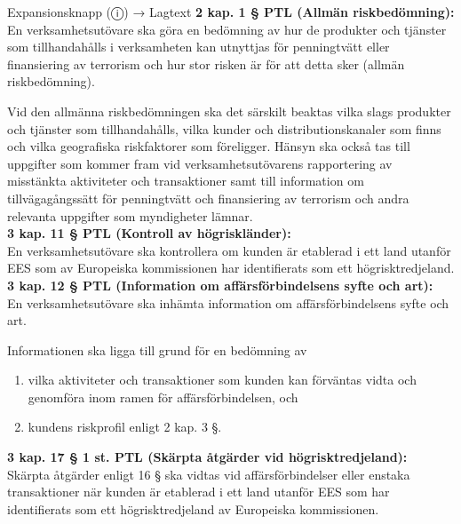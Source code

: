 \documentclass[10pt]{beamer}
\begin{document}
\begin{frame}[label=riskfragor-steg2]
\begin{alertblock}{Expansionsknapp (ⓘ) → Lagtext}
    \vspace{0.1cm}
    \tiny \textbf{2 kap. 1 § PTL (Allmän riskbedömning):}\\
    \tiny En verksamhetsutövare ska göra en bedömning av hur de produkter och tjänster som tillhandahålls 
    i verksamheten kan utnyttjas för penningtvätt eller finansiering av terrorism och hur stor risken är 
    för att detta sker (allmän riskbedömning).
    
    \tiny Vid den allmänna riskbedömningen ska det särskilt beaktas vilka slags produkter och tjänster som 
    tillhandahålls, vilka kunder och distributionskanaler som finns och vilka geografiska riskfaktorer som 
    föreligger. Hänsyn ska också tas till uppgifter som kommer fram vid verksamhetsutövarens rapportering 
    av misstänkta aktiviteter och transaktioner samt till information om tillvägagångssätt för penningtvätt 
    och finansiering av terrorism och andra relevanta uppgifter som myndigheter lämnar.\\[0.1cm]
    
    \tiny \textbf{3 kap. 11 § PTL (Kontroll av högriskländer):}\\
    \tiny En verksamhetsutövare ska kontrollera om kunden är etablerad i ett land utanför EES som av 
    Europeiska kommissionen har identifierats som ett högrisktredjeland.\\[0.1cm]
    
    \tiny \textbf{3 kap. 12 § PTL (Information om affärsförbindelsens syfte och art):}\\
    \tiny En verksamhetsutövare ska inhämta information om affärsförbindelsens syfte och art.
    
    \tiny Informationen ska ligga till grund för en bedömning av
    \begin{enumerate}
      \item vilka aktiviteter och transaktioner som kunden kan förväntas vidta och genomföra inom ramen 
      för affärsförbindelsen, och
      \item kundens riskprofil enligt 2 kap. 3 §.
    \end{enumerate}
    \vspace{0.1cm}
    
    \tiny \textbf{3 kap. 17 § 1 st. PTL (Skärpta åtgärder vid högrisktredjeland):}\\
    \tiny Skärpta åtgärder enligt 16 § ska vidtas vid affärsförbindelser eller enstaka transaktioner 
    när kunden är etablerad i ett land utanför EES som har identifierats som ett högrisktredjeland av 
    Europeiska kommissionen.\\[0.1cm]
  \end{alertblock}


\end{frame}
\end{document}
